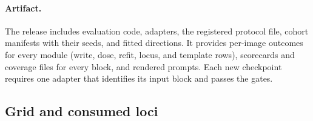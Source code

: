 \documentclass{article}
\begin{document}
\paragraph{Artifact.} The release includes evaluation code, adapters, the registered protocol file, cohort manifests with their seeds, and fitted directions. It provides per-image outcomes for every module (write, dose, refit, locus, and template rows), scorecards and coverage files for every block, and rendered prompts. Each new checkpoint requires one adapter that identifies its input block and passes the gates.

\subsection{Grid and consumed loci}
\label{app:cf-grid}
\end{document}
